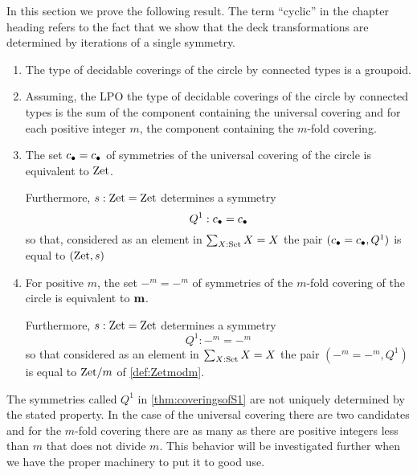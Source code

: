 In this section we prove the following result.  The term ``cyclic'' in the chapter heading refers to the fact that we show that the deck transformations are determined by iterations of a single symmetry.  
\begin{theorem}
  \label{thm:coveringsofS1}
  \begin{enumerate}
  \item The type of decidable coverings of the circle by connected types is a groupoid.
  \item Assuming, the LPO the type of decidable coverings of the circle by connected types is the sum of the component containing the universal covering and for each positive integer $m$, the component containing the $m$-fold covering.
  \item The set $c_\bullet=c_\bullet$ of symmetries of the universal covering of the circle is equivalent to $\mathrm{Zet}$.  

Furthermore, $s:\mathrm{Zet}=\mathrm{Zet}$ determines a symmetry $$Q^1:c_\bullet=c_\bullet$$ so that, considered as an element in $\sum_{X:\mathord{\mathrm{Set}}}X=X$ the pair $(c_\bullet=c_\bullet,Q^1)$ is equal to $(\mathrm{Zet},s)$
  \item For positive $m$, the set $-^m=-^m$ of symmetries of the $m$-fold covering of the circle is equivalent to $\mathbf{m}$.  

Furthermore, $s:\mathrm{Zet}=\mathrm{Zet}$ determines a symmetry $$Q^1:-^m=-^m$$ so that considered as an element in $\sum_{X:\mathord{\mathrm{Set}}}X=X$ the pair $(-^m=-^m,Q^1)$ is equal to $\mathrm{Zet}/m$ of \cref{def:Zetmodm}.
  \end{enumerate}
\end{theorem}
\begin{remark}\label{rem:thenonuniquenessofgeneratorsofmodulararithmetic1}
  The symmetries called $Q^1$ in \cref{thm:coveringsofS1} are not uniquely determined by the stated property.  
In the case of the universal covering there are two candidates and for the $m$-fold covering there are as many as there are positive integers less than $m$ that does not divide $m$.  
This behavior will be investigated further when we have the proper machinery to put it to good use.
\end{remark}


